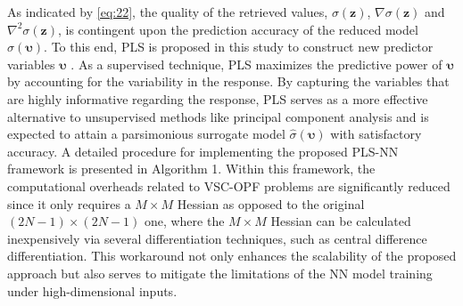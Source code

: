 \documentclass[journal]{IEEEtran}
\theoremstyle{definition}
\theoremstyle{remark}
\begin{document}
As indicated by \eqref{eq:22}, the quality of the retrieved values, $\sigma(\boldsymbol{z})$, $\nabla \sigma(\boldsymbol{z})$ and $\nabla^2 \sigma(\boldsymbol{z})$, is contingent upon the prediction accuracy of the reduced model $\hat{\sigma}(\boldsymbol{\upsilon})$. To this end, PLS is proposed in this study to construct new predictor variables $\boldsymbol{\upsilon}$ \cite{de1993simpls}. As a supervised technique, PLS maximizes the predictive power of $\boldsymbol{\upsilon}$ by accounting for the variability in the response. By capturing the variables that are highly informative regarding the response, PLS serves as a more effective alternative to unsupervised methods like principal component analysis and is expected to attain a parsimonious surrogate model $\hat{\sigma}(\boldsymbol{\upsilon})$ with satisfactory accuracy. 
A detailed procedure for implementing the proposed PLS-NN framework is presented in Algorithm 1. Within this framework, the computational overheads related to VSC-OPF problems are significantly reduced since it only requires a $M \times M$ Hessian as opposed to the original $(2N-1)\times (2N-1)$ one, where the $M \times M$ Hessian can be calculated inexpensively via several differentiation techniques, such as central difference differentiation. This workaround not only enhances the scalability of the proposed approach but also serves to mitigate the limitations of the NN model training under high-dimensional inputs.
\end{document}
